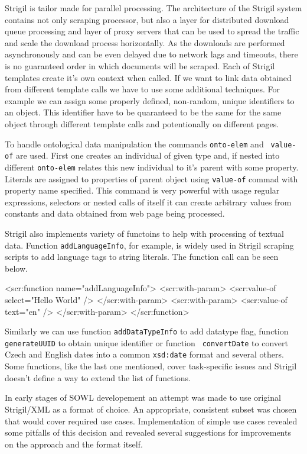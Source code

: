 Strigil is tailor made for parallel processing. The architecture of the Strigil
system contains not only scraping processor, but also a layer for distributed
download queue processing and layer of proxy servers that can be used to spread
the traffic and scale the download process horizontally. As the downloads are
performed asynchronously and can be even delayed due to network lags and
timeouts, there is no guaranteed order in which documents will be scraped.
Each of Strigil templates create it's own context when called. If we want to
link data obtained from different template calls we have to use some additional
techniques. For example we can assign some properly defined, non-random, unique
identifiers to an object. This identifier have to be quaranteed to be the same
for the same object through different template calls and potentionally on
different pages. 

To handle ontological data manipulation the commands {\tt onto-elem} and {\tt
value-of} are used. First one creates an individual of given type and, if
nested into different {\tt onto-elem} relates this new individual to it's
parent with some property. Literals are assigned to properties of parent object
using {\tt value-of} commad with property name specified. This command is very
powerful with usage regular expressions, selectors or nested calls of itself it
can create arbitrary values from constants and data obtained from web page
being processed. 

Strigil also implements variety of functoins to help with processing of textual
data. Function {\tt addLanguageInfo}, for example, is widely used in Strigil
scraping scripts to add language tags to string literals. The function call can
be seen below. 

\begtt
<scr:function name="addLanguageInfo">
  <scr:with-param>
    <scr:value-of select="Hello World" />
  </scr:with-param>
  <scr:with-param>
    <scr:value-of text="en" />
  </scr:with-param>
</scr:function>
\endtt

Similarly we can use function {\tt addDataTypeInfo} to add datatype flag,
function {\tt generateUUID} to obtain unique identifier or function {\tt
convertDate} to convert Czech and English dates into a common {\tt xsd:date}
format and several others. Some functions, like the last one mentioned, cover
task-specific issues and Strigil doesn't define a way to extend the list of
functions. 

In early stages of SOWL developement an attempt was made to use original
Strigil/XML as a format of choice. An appropriate, consistent subset was chosen
that would cover required use cases. Implementation of simple use cases
revealed some pitfalls of this decision and revealed several suggestions for
improvements on the approach and the format itself. 


